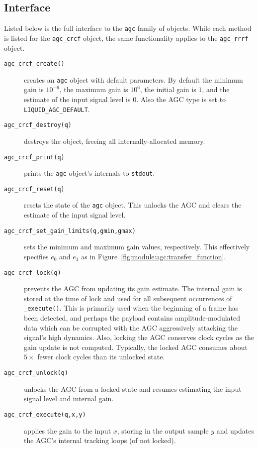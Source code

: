 \subsection{Interface}
\label{module:agc:squelch:interface}
Listed below is the full interface to the {\tt agc} family of objects.
While each method is listed for the {\tt agc\_crcf} object, the same
functionality applies to the {\tt agc\_rrrf} object.
\begin{description}
\item[{\tt agc\_crcf\_create()}]
    creates an {\tt agc} object with default parameters.
    By default the minimum gain is $10^{-6}$, the maximum gain is $10^6$, the
    initial gain is $1$, and the estimate of the input signal level is $0$.
    Also the AGC type is set to {\tt LIQUID\_AGC\_DEFAULT}.
\item[{\tt agc\_crcf\_destroy(q)}]
    destroys the object, freeing all internally-allocated memory.
\item[{\tt agc\_crcf\_print(q)}]
    prints the {\tt agc} object's internals to {\tt stdout}.
\item[{\tt agc\_crcf\_reset(q)}]
    resets the state of the {\tt agc} object.
    This unlocks the AGC and clears the estimate of the input signal level.
\item[{\tt agc\_crcf\_set\_gain\_limits(q,gmin,gmax)}]
    sets the minimum and maximum gain values, respectively.
    This effectively specifies $e_0$ and $e_1$ as in
    Figure~\ref{fig:module:agc:transfer_function}.
\item[{\tt agc\_crcf\_lock(q)}]
    prevents the AGC from updating its gain estimate.
    The internal gain is stored at the time of lock and used for all
    subsequent occurrences of {\tt \_execute()}.
    This is primarily used when the beginning of a frame has been detected,
    and perhaps the payload contains amplitude-modulated data which can be
    corrupted with the AGC aggressively attacking the signal's high
    dynamics.
    Also, locking the AGC conserves clock cycles as the gain update is
    not computed.
    Typically, the locked AGC consumes about $5\times$ fewer clock
    cycles than its unlocked state.
\item[{\tt agc\_crcf\_unlock(q)}]
    unlocks the AGC from a locked state and resumes estimating the input
    signal level and internal gain.
\item[{\tt agc\_crcf\_execute(q,x,y)}]
    applies the gain to the input $x$, storing in the output sample $y$
    and updates the AGC's internal tracking loops (of not locked).

\end{description}
